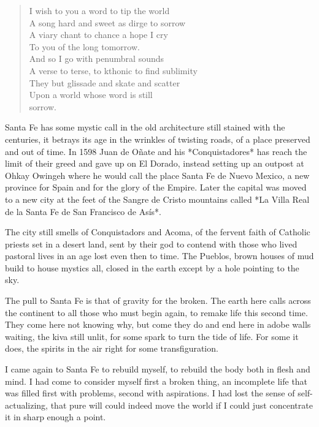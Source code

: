 \documentclass[ebook, 10pt, openright, onecolumn]{memoir}
\newenvironment{poetry}
{
  \begin{quote}
    \begin{itshape}
      \small
    }
    {
    \end{itshape}
  \end{quote}
}
\begin{document}
\begin{poetry}
  I wish to you a word to tip the world\\
  A song hard and sweet as dirge to sorrow\\
  A viary chant to chance a hope I cry\\
  To you of the long tomorrow.\\

  And so I go with penumbral sounds\\
  A verse to terse, to kthonic to find sublimity\\
  They but glissade and skate and scatter\\
  Upon a world whose word is still\\
  sorrow.\\
\end{poetry}


Santa Fe has some mystic call in the old architecture still stained with the
centuries, it betrays its age in the wrinkles of twisting roads, of a place
preserved and out of time.  In 1598 Juan de Oñate and his *Conquistadores* has
reach the limit of their greed and gave up on El Dorado, instead setting up an
outpost at Ohkay Owingeh where he would call the place Santa Fe de Nuevo
Mexico, a new province for Spain and for the glory of the Empire.  Later the
capital was moved to a new city at the feet of the Sangre de Cristo mountains
called *La Villa Real de la Santa Fe de San Francisco de Asís*.

The city still smells of Conquistadors and Acoma, of the fervent faith of
Catholic priests set in a desert land, sent by their god to contend with those
who lived pastoral lives in an age lost even then to time.  The Pueblos, brown
houses of mud build to house mystics all, closed in the earth except by a hole
pointing to the sky.

The pull to Santa Fe is that of gravity for the broken.  The earth here calls
across the continent to all those who must begin again, to remake life this
second time.  They come here not knowing why, but come they do and end here in
adobe walls waiting, the kiva still unlit, for some spark to turn the tide of
life.  For some it does, the spirits in the air right for some transfiguration.

I came again to Santa Fe to rebuild myself, to rebuild the body both in flesh
and mind.  I had come to consider myself first a broken thing, an incomplete
life that was filled first with problems, second with aspirations.  I had lost
the sense of self-actualizing, that pure will could indeed move the world if I
could just concentrate it in sharp enough a point.
\end{document}

